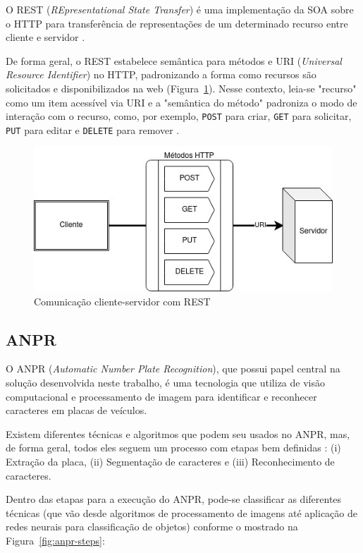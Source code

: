 \documentclass[12pt]{article}
\begin{document}
O REST (\textit{REpresentational State Transfer}) é uma implementação da SOA sobre o HTTP para transferência de representações de um determinado recurso entre cliente e servidor \cite{mumbaikar2013}.

De forma geral, o REST estabelece semântica para métodos e URI (\textit{Universal Resource Identifier}) no HTTP, padronizando a forma como recursos são solicitados e disponibilizados na web (Figura~\ref{fig:rest}). Nesse contexto, leia-se "recurso" como um item acessível via URI e a "semântica do método" padroniza o modo de interação com o recurso, como, por exemplo, \texttt{POST} para criar, \texttt{GET} para solicitar, \texttt{PUT} para editar e \texttt{DELETE} para remover \cite{adamczyk2011}.

\begin{figure}[ht]
	\centering
	\includegraphics[width=.8\textwidth]{rest.jpg}
	\caption{Comunicação cliente-servidor com REST}
	\label{fig:rest}
\end{figure} 

\subsection{ANPR}

O ANPR (\textit{Automatic Number Plate Recognition}), que possui papel central na solução desenvolvida neste trabalho, é uma tecnologia que utiliza de visão computacional e processamento de imagem para identificar e reconhecer caracteres em placas de veículos.

Existem diferentes técnicas e algoritmos que podem seu usados no ANPR, mas, de forma geral, todos eles seguem um processo com etapas bem definidas \cite{mufti2021}: (i) Extração da placa, (ii) Segmentação de caracteres e (iii) Reconhecimento de caracteres.

Dentro das etapas para a execução do ANPR, \cite{shashirangana2020} pode-se classificar as diferentes técnicas (que vão desde algoritmos de processamento de imagens até aplicação de redes neurais para classificação de objetos) conforme o mostrado na Figura~\ref{fig:anpr-steps}:
\end{document}
